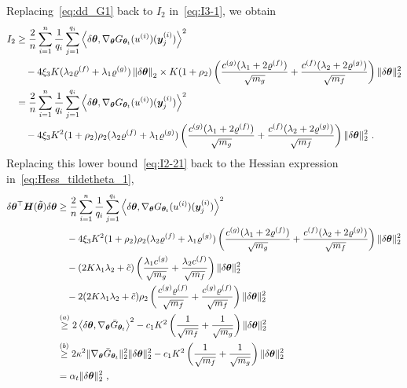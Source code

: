 Replacing~\eqref{eq:dd_G1} back to $I_2$ in~\eqref{eq:I3-1}, we obtain
\begin{equation}
\label{eq:I2-21}
\begin{aligned}
    I_2
%     
    & \geq\frac{2}{n} \sum_{i=1}^n \frac{1}{q_i} \sum_{j=1}^{q_i}  \left\langle \delta \vtheta , \nabla_{\vtheta} G_{\vtheta_t}(u^{(i)})(\vy^{(i)}_j) \right\rangle^2  \\
    & \quad - 
4\xi_3K(\lambda_2\varrho^{(f)}+\lambda_1\varrho^{(g)})\left\|\delta\vtheta\right\|_2
    \times K(1+\rho_2)\left( \frac{c^{(g)} (\lambda_1+2\varrho^{(f)})}{\sqrt{m_g}} + \frac{c^{(f)} (\lambda_2+2\varrho^{(g)})}{\sqrt{m_f}} \right) \| \delta \vtheta \|_2^2\\
%
& =\frac{2}{n} \sum_{i=1}^n \frac{1}{q_i} \sum_{j=1}^{q_i}  \left\langle \delta \vtheta , \nabla_{\vtheta} G_{\vtheta_t}(u^{(i)})(\vy^{(i)}_j) \right\rangle^2  \\
    & \quad - 
4\xi_3K^2(1+\rho_2)\rho_2(\lambda_2\varrho^{(f)}+\lambda_1\varrho^{(g)})
    \left( \frac{c^{(g)} (\lambda_1+2\varrho^{(f)})}{\sqrt{m_g}} + \frac{c^{(f)} (\lambda_2+2\varrho^{(g)})}{\sqrt{m_f}} \right) \| \delta \vtheta \|_2^2~.    
\end{aligned}
\end{equation}
Replacing this lower bound~\eqref{eq:I2-21} back to the Hessian expression in~\eqref{eq:Hess_tildetheta_1},
\begin{equation}
\label{eq:Hess_tildetheta_1}
\begin{aligned}
    \delta \vtheta^{\top} \mH (\tilde{\vtheta}) \delta \vtheta
&\geq\frac{2}{n} \sum_{i=1}^n \frac{1}{q_i} \sum_{j=1}^{q_i}  \left\langle \delta \vtheta , \nabla_{\vtheta} G_{\vtheta_t}(u^{(i)})(\vy^{(i)}_j) \right\rangle^2  \\
    & \quad - 
4\xi_3K^2(1+\rho_2)\rho_2(\lambda_2\varrho^{(f)}+\lambda_1\varrho^{(g)})
    \left( \frac{c^{(g)} (\lambda_1+2\varrho^{(f)})}{\sqrt{m_g}} + \frac{c^{(f)} (\lambda_2+2\varrho^{(g)})}{\sqrt{m_f}} \right) \| \delta \vtheta \|_2^2\\
&\quad- 
    (2K\lambda_1\lambda_2+\tilde{c})
    \left(\frac{\lambda_1 c^{(g)}}{\sqrt{m_g}} + \frac{\lambda_2 c^{(f)}}{\sqrt{m_f}}\right) \| \delta \vtheta \|_2^2\\
& \quad- 2(2K\lambda_1\lambda_2+\tilde{c})\rho_2 \left( \frac{c^{(g)} \varrho^{(f)}}{\sqrt{m_f}} + \frac{c^{(g)} \varrho^{(f)}}{\sqrt{m_f}} \right) \| \delta \vtheta \|_2^2\\
%
&\overset{(a)}{\geq} 2 \left\langle \delta \vtheta , \nabla_{\vtheta} \bar{G}_{\vtheta_t} \right\rangle^2  - c_1 K^2
\left( \frac{1}{\sqrt{m_f}} + \frac{1}{\sqrt{m_g}} \right) \| \delta \vtheta \|_2^2\\
&\overset{(b)}{\geq} 2\kappa^2 \norm{\nabla_{\vtheta} \bar{G}_{\vtheta_t}}^2_2\norm{\delta\vtheta}_2^2  - c_1 K^2
\left( \frac{1}{\sqrt{m_f}} + \frac{1}{\sqrt{m_g}} \right) \| \delta \vtheta \|_2^2\\
%
&=\alpha_t\norm{\delta\vtheta}_2^2~,
%
\end{aligned}
\end{equation}
